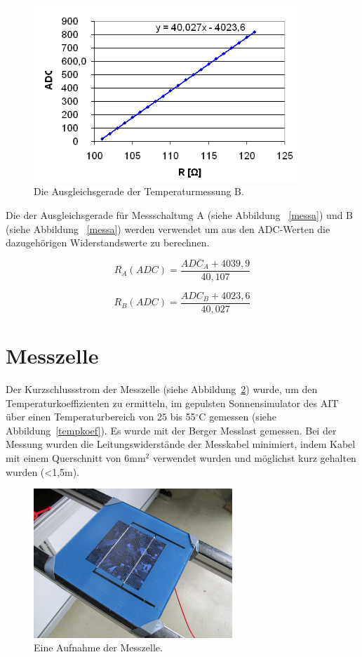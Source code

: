 \documentclass[a4paper,bibtotoc,oneside]{scrbook}
\begin{document}
\begin{figure}[htbp]
\centering
\includegraphics[width=100mm]{img/messb.png}
\caption{Die Ausgleichsgerade der Temperaturmessung B.}\label{messb}
\end{figure}

\noindent Die der Ausgleichsgerade für Messschaltung A (siehe Abbildung ~\ref{messa}) und B (siehe Abbildung ~\ref{messa}) werden verwendet um aus den ADC-Werten die dazugehörigen Widerstandswerte zu berechnen. 

  \begin{equation}
     R_A(ADC) = \frac{ADC_A + 4039,9}{40,107}
  \end{equation}
  
    \begin{equation}
     R_B(ADC) = \frac{ADC_B + 4023,6}{40,027}
  \end{equation}

 


\section{Messzelle}\thispagestyle{empty}


Der Kurzschlussstrom der Messzelle (siehe Abbildung~\ref{zelleflasher}) wurde, um den Temperaturkoeffizienten zu ermitteln, im gepulsten Sonnensimulator des AIT über einen Temperaturbereich von 25 bis 55$^{\circ}$C gemessen (siehe Abbildung~\ref{tempkoef}). Es wurde mit der Berger Messlast \cite{berger} gemessen. Bei der Messung wurden die Leitungswiderstände der Messkabel minimiert, indem Kabel mit einem  Querschnitt von 6mm$^2$ verwendet wurden und möglichst kurz gehalten wurden (<1,5m).
 
\begin{figure}[htbp]
\centering
\includegraphics[width=75mm]{img/zelle.jpg}
\caption{Eine Aufnahme der Messzelle.}\label{zelleflasher}
\end{figure}
\end{document}
